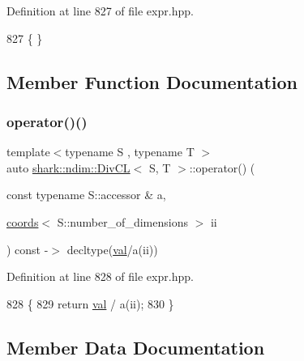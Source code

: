 Definition at line 827 of file expr.\+hpp.


\begin{DoxyCode}
827 \{ \}
\end{DoxyCode}


\subsection{Member Function Documentation}
\hypertarget{classshark_1_1ndim_1_1_div_c_l_aa5c616ce4fd058bf3a304b0686c8cd12}{}\label{classshark_1_1ndim_1_1_div_c_l_aa5c616ce4fd058bf3a304b0686c8cd12} 
\subsubsection{\texorpdfstring{operator()()}{operator()()}}
{\footnotesize\ttfamily template$<$typename S , typename T $>$ \\
auto \hyperlink{classshark_1_1ndim_1_1_div_c_l}{shark\+::ndim\+::\+Div\+CL}$<$ S, T $>$\+::operator() (\begin{DoxyParamCaption}\item[{const typename S\+::accessor \&}]{a,  }\item[{\hyperlink{structshark_1_1ndim_1_1coords}{coords}$<$ S\+::number\+\_\+of\+\_\+dimensions $>$}]{ii }\end{DoxyParamCaption}) const -\/$>$ decltype(\hyperlink{classshark_1_1ndim_1_1_div_c_l_af54241a85b56dd2e61b4e849b1ad1dd7}{val}/a(ii)) \hspace{0.3cm}{\ttfamily [inline]}}



Definition at line 828 of file expr.\+hpp.


\begin{DoxyCode}
828                                                                                                            
                   \{
829                 \textcolor{keywordflow}{return} \hyperlink{classshark_1_1ndim_1_1_div_c_l_af54241a85b56dd2e61b4e849b1ad1dd7}{val} / a(ii);
830             \}
\end{DoxyCode}


\subsection{Member Data Documentation}
\hypertarget{classshark_1_1ndim_1_1_div_c_l_af54241a85b56dd2e61b4e849b1ad1dd7}{}\label{classshark_1_1ndim_1_1_div_c_l_af54241a85b56dd2e61b4e849b1ad1dd7} 
